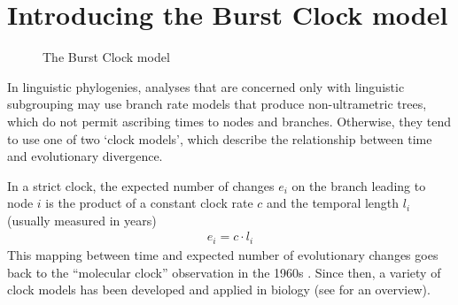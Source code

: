 \documentclass[]{rsos}%
\begin{document}
\section{Introducing the Burst Clock model}\label{s:description}
\begin{figure}
    \centering
    \caption{The Burst Clock model}
    \label{f:burstclock}
\end{figure}
In linguistic phylogenies,
analyses that are
concerned only with linguistic subgrouping may use branch rate models that
produce non-ultrametric trees, which do not permit ascribing times to nodes and
branches.
Otherwise, they tend to use one of two ‘clock models’, which describe the relationship between
time and evolutionary divergence.

In a strict clock,
the expected number of changes $e_i$ on the branch leading to node $i$ is the product of a constant clock rate $c$ and the temporal length $l_i$ (usually measured in years)
\begin{align}
  e_i = c \cdot l_i
  \label{eq:strict}
\end{align}
This mapping between time and expected number of evolutionary changes goes back
to the “molecular clock” observation in the 1960s
\parencite{zuckerkandl1965evolutionary,kumar2005molecular}. Since then, a variety of clock models
has been developed and applied in biology (see \textcite{ho2014molecularclock} for an
overview).
\end{document}
